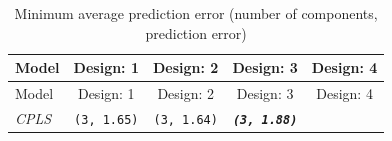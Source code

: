 \documentclass[12pt,A4paper,authoryear]{elsarticle} %
\theoremstyle{definition}
\theoremstyle{definition}
\theoremstyle{remark}
\begin{document}
\begin{longtable}[]{@{}lcccc@{}}
\caption{\label{tab:min-error} Minimum average prediction error (number of
components, prediction error)}\tabularnewline
\toprule
\begin{minipage}[b]{0.09\columnwidth}\raggedright\strut
Model\strut
\end{minipage} & \begin{minipage}[b]{0.19\columnwidth}\centering\strut
Design: 1\strut
\end{minipage} & \begin{minipage}[b]{0.19\columnwidth}\centering\strut
Design: 2\strut
\end{minipage} & \begin{minipage}[b]{0.19\columnwidth}\centering\strut
Design: 3\strut
\end{minipage} & \begin{minipage}[b]{0.19\columnwidth}\centering\strut
Design: 4\strut
\end{minipage}\tabularnewline
\midrule
\endfirsthead
\toprule
\begin{minipage}[b]{0.09\columnwidth}\raggedright\strut
Model\strut
\end{minipage} & \begin{minipage}[b]{0.19\columnwidth}\centering\strut
Design: 1\strut
\end{minipage} & \begin{minipage}[b]{0.19\columnwidth}\centering\strut
Design: 2\strut
\end{minipage} & \begin{minipage}[b]{0.19\columnwidth}\centering\strut
Design: 3\strut
\end{minipage} & \begin{minipage}[b]{0.19\columnwidth}\centering\strut
Design: 4\strut
\end{minipage}\tabularnewline
\midrule
\endhead
\begin{minipage}[t]{0.09\columnwidth}\raggedright\strut
\emph{CPLS}\strut
\end{minipage} & \begin{minipage}[t]{0.19\columnwidth}\centering\strut
\texttt{(3,\ 1.65)}\strut
\end{minipage} & \begin{minipage}[t]{0.19\columnwidth}\centering\strut
\texttt{(3,\ 1.64)}\strut
\end{minipage} & \begin{minipage}[t]{0.19\columnwidth}\centering\strut
\textbf{\emph{\texttt{(3,\ 1.88)}}}\strut

\end{minipage}
\end{longtable}
\end{document}
